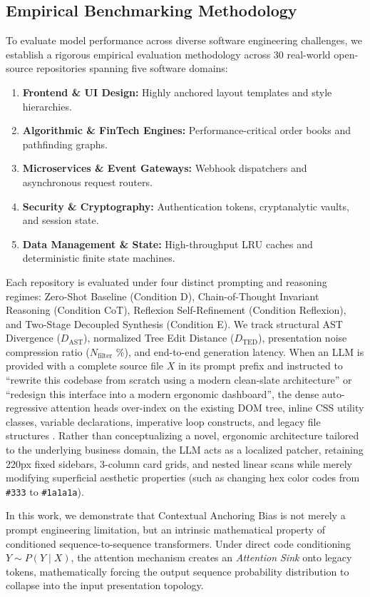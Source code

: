 \documentclass[10pt,journal,compsoc]{IEEEtran}
\begin{document}
\subsection{Empirical Benchmarking Methodology}
To evaluate model performance across diverse software engineering challenges, we establish a rigorous empirical evaluation methodology across 30 real-world open-source repositories spanning five software domains:
\begin{enumerate}
    \item \textbf{Frontend \& UI Design:} Highly anchored layout templates and style hierarchies.
    \item \textbf{Algorithmic \& FinTech Engines:} Performance-critical order books and pathfinding graphs.
    \item \textbf{Microservices \& Event Gateways:} Webhook dispatchers and asynchronous request routers.
    \item \textbf{Security \& Cryptography:} Authentication tokens, cryptanalytic vaults, and session state.
    \item \textbf{Data Management \& State:} High-throughput LRU caches and deterministic finite state machines.
\end{enumerate}
Each repository is evaluated under four distinct prompting and reasoning regimes: Zero-Shot Baseline (Condition D), Chain-of-Thought Invariant Reasoning (Condition CoT), Reflexion Self-Refinement (Condition Reflexion), and Two-Stage Decoupled Synthesis (Condition E). We track structural AST Divergence ($D_{\text{AST}}$), normalized Tree Edit Distance ($D_{\text{TED}}$), presentation noise compression ratio ($N_{\text{filter}}$ \%), and end-to-end generation latency. When an LLM is provided with a complete source file $X$ in its prompt prefix and instructed to ``rewrite this codebase from scratch using a modern clean-slate architecture'' or ``redesign this interface into a modern ergonomic dashboard'', the dense auto-regressive attention heads over-index on the existing DOM tree, inline CSS utility classes, variable declarations, imperative loop constructs, and legacy file structures \cite{xiao2023efficient, liu2023lost}. Rather than conceptualizing a novel, ergonomic architecture tailored to the underlying business domain, the LLM acts as a localized patcher, retaining 220px fixed sidebars, 3-column card grids, and nested linear scans while merely modifying superficial aesthetic properties (such as changing hex color codes from \texttt{\#333} to \texttt{\#1a1a1a}).

In this work, we demonstrate that Contextual Anchoring Bias is not merely a prompt engineering limitation, but an intrinsic mathematical property of conditioned sequence-to-sequence transformers. Under direct code conditioning $Y \sim P(Y \mid X)$, the attention mechanism creates an \textit{Attention Sink} onto legacy tokens, mathematically forcing the output sequence probability distribution to collapse into the input presentation topology.
\end{document}
